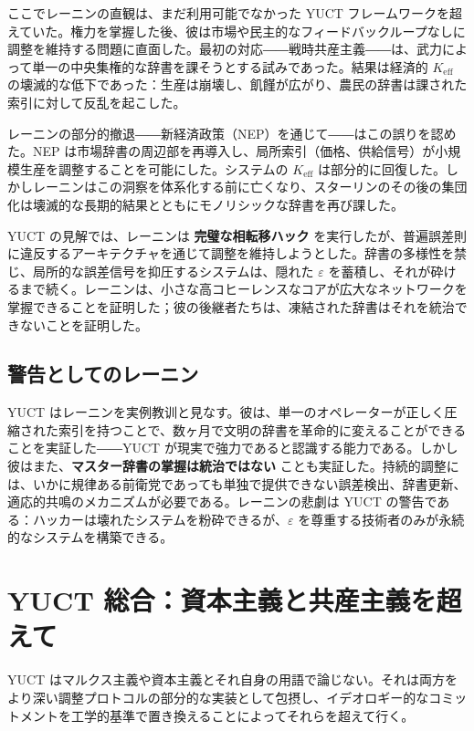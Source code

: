 \documentclass[12pt,a4paper]{article}
\newcommand{\Keff}{K_{\mathrm{eff}}}
\begin{document}
	ここでレーニンの直観は、まだ利用可能でなかった YUCT フレームワークを超えていた。権力を掌握した後、彼は市場や民主的なフィードバックループなしに調整を維持する問題に直面した。最初の対応――戦時共産主義――は、武力によって単一の中央集権的な辞書を課そうとする試みであった。結果は経済的 \(\Keff\) の壊滅的な低下であった：生産は崩壊し、飢饉が広がり、農民の辞書は課された索引に対して反乱を起こした。
	
	レーニンの部分的撤退――新経済政策（NEP）を通じて――はこの誤りを認めた。NEP は市場辞書の周辺部を再導入し、局所索引（価格、供給信号）が小規模生産を調整することを可能にした。システムの \(\Keff\) は部分的に回復した。しかしレーニンはこの洞察を体系化する前に亡くなり、スターリンのその後の集団化は壊滅的な長期的結果とともにモノリシックな辞書を再び課した。
	
	YUCT の見解では、レーニンは \textbf{完璧な相転移ハック} を実行したが、普遍誤差則に違反するアーキテクチャを通じて調整を維持しようとした。辞書の多様性を禁じ、局所的な誤差信号を抑圧するシステムは、隠れた \(\varepsilon\) を蓄積し、それが砕けるまで続く。レーニンは、小さな高コヒーレンスなコアが広大なネットワークを掌握できることを証明した；彼の後継者たちは、凍結された辞書はそれを統治できないことを証明した。
	
	\subsection{警告としてのレーニン}
	
	YUCT はレーニンを実例教训と見なす。彼は、単一のオペレーターが正しく圧縮された索引を持つことで、数ヶ月で文明の辞書を革命的に変えることができることを実証した――YUCT が現実で強力であると認識する能力である。しかし彼はまた、\textbf{マスター辞書の掌握は統治ではない} ことも実証した。持続的調整には、いかに規律ある前衛党であっても単独で提供できない誤差検出、辞書更新、適応的共鳴のメカニズムが必要である。レーニンの悲劇は YUCT の警告である：ハッカーは壊れたシステムを粉砕できるが、\(\varepsilon\) を尊重する技術者のみが永続的なシステムを構築できる。
	
	\section{YUCT 総合：資本主義と共産主義を超えて}
	\label{sec:yuct-synthesis}
	
	YUCT はマルクス主義や資本主義とそれ自身の用語で論じない。それは両方をより深い調整プロトコルの部分的な実装として包摂し、イデオロギー的なコミットメントを工学的基準で置き換えることによってそれらを超えて行く。
	
\end{document}
